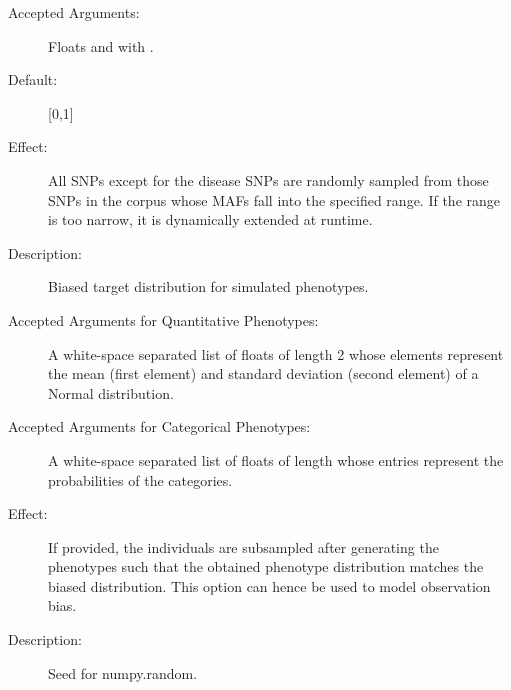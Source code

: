 \documentclass[a4paper,10pt,english]{sphinxhowto}
\begin{document}
\begin{description}
\begin{description}
\begin{description}
\item[{Accepted Arguments:}] \leavevmode
Floats  and  with .

\item[{Default:}] \leavevmode
{[}0,1{]}

\item[{Effect:}] \leavevmode
All SNPs except for the disease SNPs are randomly sampled from those SNPs in the corpus whose MAFs
fall into the specified range. If the range is too narrow, it is dynamically extended at runtime.

\end{description}

\item[{\sphinxcode{\sphinxupquote{-{-}biased-distr PARAM {[}PARAM ...{]}}}}] \leavevmode\begin{description}
\item[{Description:}] \leavevmode
Biased target distribution for simulated phenotypes.

\item[{Accepted Arguments for Quantitative Phenotypes:}] \leavevmode
A white-space separated list of floats of length 2 whose elements represent the mean (first element) and
standard deviation (second element) of a Normal distribution.

\item[{Accepted Arguments for Categorical Phenotypes:}] \leavevmode
A white-space separated list of floats of length  whose entries represent the probabilities of the 
categories.

\item[{Effect:}] \leavevmode
If provided, the individuals are subsampled after generating the phenotypes such that the obtained phenotype distribution
matches the biased distribution. This option can hence be used to model observation bias.

\end{description}

\item[{\sphinxcode{\sphinxupquote{-{-}seed SEED}}}] \leavevmode\begin{description}
\item[{Description:}] \leavevmode
Seed for numpy.random.


\end{description}
\end{description}
\end{description}
\end{document}
